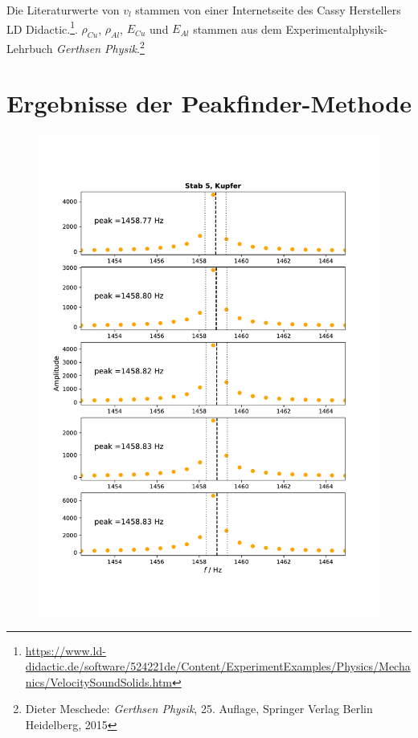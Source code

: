 \documentclass[a4paper, 12pt]{scrartcl}
\begin{document}
Die Literaturwerte von $v_l$ stammen von einer Internetseite des Cassy Herstellers LD Didactic.\footnote{\url{https://www.ld-didactic.de/software/524221de/Content/ExperimentExamples/Physics/Mechanics/VelocitySoundSolids.htm}}. $\rho_{Cu}$, $\rho_{Al}$, $E_{Cu}$ und $E_{Al}$ stammen aus dem Experimentalphysik-Lehrbuch \textit{Gerthsen Physik}.\footnote{Dieter Meschede: \textit{Gerthsen Physik}, 25. Auflage, Springer Verlag Berlin Heidelberg, 2015}

\newpage


\appendix
\newpage
\section{Ergebnisse der Peakfinder-Methode}\label{anhang:plot}
\begin{figure}[H]
	\centering
	\includegraphics[width=\linewidth]{plots/anhang1.pdf}
\end{figure}
\end{document}
